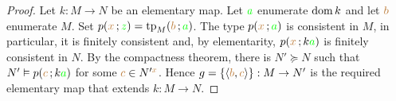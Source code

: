 \begin{proof}
Let $k:M\to N$ be an elementary map.
Let ${\color{green} a}$ enumerate $\mathop{\rm dom} k$ and let ${\color{brown} b}$ enumerate $M$.
Set $p({\color{brown} x}\,;{\color{green} z})={\rm tp}_M({\color{brown} b}\,;{\color{green} a})$.
The type $p({\color{brown} x}\,;{\color{green} a})$ is consistent in $M$, in particular, it is finitely consistent and, by elementarity,  $p({\color{brown} x}\,;k{\color{green} a})$ is finitely consistent in $N$.
By the compactness theorem, there is $N'\succeq N$ such that $N'\vDash p({\color{brown} c}\,;k{\color{green} a})$ for some ${\color{brown} c}\in N'^{\color{brown} x}$.
Hence $g=\{\langle{\color{brown}b},{\color{brown} c}\rangle\}:M\to N'$ is the required elementary map that extends $k:M\to N$.
\end{proof}
% 
% 
% 
% 
%    
% 


